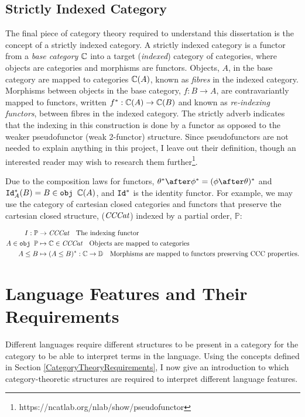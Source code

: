 \documentclass{Report}
\begin{document}
\subsection{Strictly Indexed Category}\label{IndexedCategoryDefinition}

The final piece of category theory required to understand this dissertation is the concept of a strictly indexed category. A strictly indexed category is a functor from a \textit{base category} $\mathbb{C}$ into a target (\textit{indexed}) category of categories, where objects are categories and morphisms are functors. Objects, $A$, in the base category are mapped to categories $\mathbb{C}(A)$, known as \textit{fibres} in the indexed category. Morphisms between objects in the base category, $f: B\rightarrow A$, are contravariantly mapped to functors, written $f^*: \mathbb{C}(A)\rightarrow \mathbb{C}(B)$ and known as \textit{re-indexing functors}, between fibres in the indexed category. The strictly adverb indicates that the indexing in this construction is done by a functor as opposed to the weaker pseudofunctor (weak 2-functor) structure. Since pseudofunctors are not needed to explain anything in this project, I leave out their definition, though an interested reader may wish to research them further\footnote{https://ncatlab.org/nlab/show/pseudofunctor}. 


Due to the composition laws for functors, $\theta\star\after\phi\star = (\phi\after\theta)\star$ and $\texttt{Id}_{A}^*(B) = B\in\texttt{obj } \mathbb{C}(A)$, and $\texttt{Id}_{}^*$ is the identity functor. For example, we may use the category of cartesian closed categories and functors that preserve the cartesian closed structure, ($\textit{CCCat}$) indexed by a partial order, $\mathbb{P}$:

\begin{align*}
    I: \mathbb{P} & \rightarrow \textit{CCCat}\quad\text{The indexing functor} \\
    A \in\texttt{obj }\mathbb{P} & \mapsto \mathbb{C} \in\textit{CCCat}\quad\text{Objects are mapped to categories}\\
    A \leq B & \mapsto (A \leq B)^*: \mathbb{C} \rightarrow \mathbb{D}\quad\text{Morphisms are mapped to functors preserving CCC properties.}
\end{align*}

\section{Language Features and Their Requirements}\label{LanguageFeatureRequirements}


Different languages require different structures to be present in a category for the category to be able to interpret terms in the language. Using the concepts defined in Section \ref{CategoryTheoryRequirements}, I now give an introduction to which category-theoretic structures are required to interpret different language features. 
\end{document}

